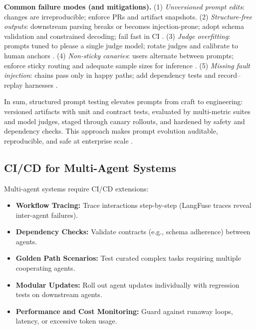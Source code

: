 \noindent\textbf{Common failure modes (and mitigations).}
(1) \emph{Unversioned prompt edits}: changes are irreproducible; enforce PRs and artifact snapshots.  
(2) \emph{Structure-free outputs}: downstream parsing breaks or becomes injection-prone; adopt schema validation and constrained decoding; fail fast in CI \cite{owasp_llm}.  
(3) \emph{Judge overfitting}: prompts tuned to please a single judge model; rotate judges and calibrate to human anchors \cite{zheng2023judge}.  
(4) \emph{Non-sticky canaries}: users alternate between prompts; enforce sticky routing and adequate sample sizes for inference \cite{mcnemar1947}.  
(5) \emph{Missing fault injection}: chains pass only in happy paths; add dependency tests and record--replay harnesses \cite{phoenix_rag}.  

\medskip
In sum, structured prompt testing elevates prompts from craft to engineering: versioned artifacts with unit and contract tests, evaluated by multi-metric suites and model judges, staged through canary rollouts, and hardened by safety and dependency checks. This approach makes prompt evolution auditable, reproducible, and safe at enterprise scale \cite{promptfoo,openai_evals,lm_harness,zheng2023judge,owasp_llm}.

\subsection{CI/CD for Multi-Agent Systems}
\label{sec:cicd-multi-agent}
\begin{tcolorbox}[
  title={\textbf{CI/CD Extensions for Multi-Agent Systems}},
  colback=red!5,
  colframe=red!40!black,
  colbacktitle=red!20,
  coltitle=black,
  fonttitle=\bfseries,
  boxrule=0.7pt,
  arc=4pt,
  left=5mm, right=5mm, top=4mm, bottom=4mm,
  before skip=6pt,
  after skip=6pt
]
Multi-agent systems require CI/CD extensions:
\begin{itemize}[leftmargin=1.5em, itemsep=4pt, topsep=2pt]
    \item \textbf{Workflow Tracing:} Trace interactions step-by-step (LangFuse traces reveal inter-agent failures).
    \item \textbf{Dependency Checks:} Validate contracts (e.g., schema adherence) between agents.
    \item \textbf{Golden Path Scenarios:} Test curated complex tasks requiring multiple cooperating agents.
    \item \textbf{Modular Updates:} Roll out agent updates individually with regression tests on downstream agents.
    \item \textbf{Performance and Cost Monitoring:} Guard against runaway loops, latency, or excessive token usage.
\end{itemize}
\end{tcolorbox}

